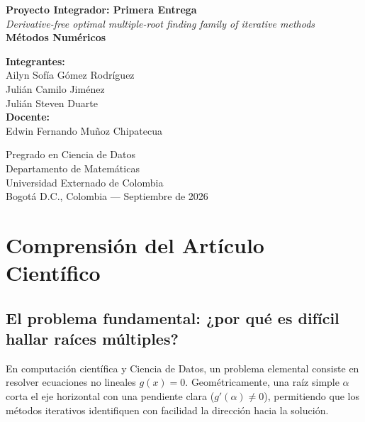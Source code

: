 ﻿\documentclass[10pt, a4paper]{article}
\begin{document}
\begin{titlepage}
    \centering
    \vspace*{2.0cm}
    
    {\LARGE\bfseries Proyecto Integrador: Primera Entrega}\\[0.5cm]
    {\large\itshape Derivative-free optimal multiple-root finding family of iterative methods}\\[0.6cm]
    {\Large\textbf{Métodos Numéricos}}\\[3.0cm]
    
    \begin{minipage}{0.85\textwidth}
        \centering
        \textbf{\large Integrantes:}\\[0.3cm]
        Ailyn Sofía Gómez Rodríguez\\[0.15cm]
        Julián Camilo Jiménez\\[0.15cm]
        Julián Steven Duarte\\[1.4cm]
        
        \textbf{\large Docente:}\\[0.3cm]
        Edwin Fernando Muñoz Chipatecua
    \end{minipage}
    
    \vfill
    
    {\normalsize Pregrado en Ciencia de Datos\\
    Departamento de Matemáticas\\
    Universidad Externado de Colombia\\
    Bogotá D.C., Colombia --- Septiembre de 2026}
    \vspace*{0.5cm}
\end{titlepage}

\newpage
{}
\setcounter{page}{2}

\section{Comprensión del Artículo Científico}

\subsection{El problema fundamental: ¿por qué es difícil hallar raíces múltiples?}
En computación científica y Ciencia de Datos, un problema elemental consiste en resolver ecuaciones no lineales $g(x) = 0$. Geométricamente, una raíz simple $\alpha$ corta el eje horizontal con una pendiente clara ($g'(\alpha) \neq 0$), permitiendo que los métodos iterativos identifiquen con facilidad la dirección hacia la solución.
\end{document}
